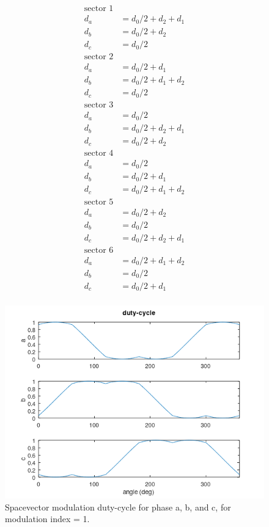 \documentclass[]{book}
\begin{document}
\[
\begin{aligned}
\text{sector 1}&\\
d_a  &  =  d_0/2 + d_2+d_1\\
d_b  &  =  d_0/2 + d_2\\
d_c  &  =  d_0/2\\
\text{sector 2}&\\
d_a  &  =  d_0/2 + d_1\\
d_b  &  =  d_0/2 + d_1+d_2\\
d_c  &  =  d_0/2\\
\text{sector 3}&\\
d_a  &  =  d_0/2 \\
d_b  &  =  d_0/2 + d_2+d_1\\
d_c  &  =  d_0/2 + d_2\\
\text{sector 4}&\\
d_a  &  =  d_0/2\\
d_b  &  =  d_0/2 + d_1\\
d_c  &  =  d_0/2 + d_1+d_2\\
\text{sector 5}&\\
d_a  &  =  d_0/2 + d_2\\
d_b  &  =  d_0/2\\
d_c  &  =  d_0/2 + d_2+d_1\\
\text{sector 6}&\\
d_a  &  =  d_0/2 + d_1+d_2\\
d_b  &  =  d_0/2\\
d_c  &  =  d_0/2 + d_1\\
\end{aligned}
\]

\begin{figure}
\includegraphics[width=1\linewidth]{images/modulation/svm-dutycycle} \caption{Spacevector modulation duty-cycle for phase a, b, and c, for modulation index = 1.}\label{fig:unnamed-chunk-5}
\end{figure}
\end{document}
